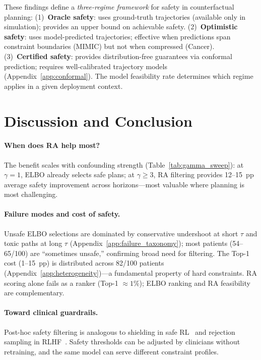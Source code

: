 \documentclass{article}
\begin{document}
These findings define a \emph{three-regime framework} for safety in counterfactual planning: (1)~\textbf{Oracle safety}: uses ground-truth trajectories (available only in simulation); provides an upper bound on achievable safety. (2)~\textbf{Optimistic safety}: uses model-predicted trajectories; effective when predictions span constraint boundaries (MIMIC) but not when compressed (Cancer). (3)~\textbf{Certified safety}: provides distribution-free guarantees via conformal prediction; requires well-calibrated trajectory models (Appendix~\ref{app:conformal}). The model feasibility rate determines which regime applies in a given deployment context.


\section{Discussion and Conclusion}
\label{sec:discussion}

\vspace{-0.8em}
\paragraph{When does RA help most?} The benefit scales with confounding strength (Table~\ref{tab:gamma_sweep}): at $\gamma = 1$, ELBO already selects safe plans; at $\gamma \geq 3$, RA filtering provides 12--15~pp average safety improvement across horizons---most valuable where planning is most challenging.

\vspace{-0.8em}
\paragraph{Failure modes and cost of safety.} Unsafe ELBO selections are dominated by conservative undershoot at short $\tau$ and toxic paths at long $\tau$ (Appendix~\ref{app:failure_taxonomy}); most patients (54--65/100) are ``sometimes unsafe,'' confirming broad need for filtering. The Top-1 cost (1--15~pp) is distributed across 82/100 patients (Appendix~\ref{app:heterogeneity})---a fundamental property of hard constraints. RA scoring alone fails as a ranker (Top-1 $\approx 1\%$); ELBO ranking and RA feasibility are complementary.

\vspace{-0.8em}
\paragraph{Toward clinical guardrails.} Post-hoc safety filtering is analogous to shielding in safe RL~\citep{alshiekh2018shielding} and rejection sampling in RLHF~\citep{bai2022constitutional}. Safety thresholds can be adjusted by clinicians without retraining, and the same model can serve different constraint profiles.
\end{document}
